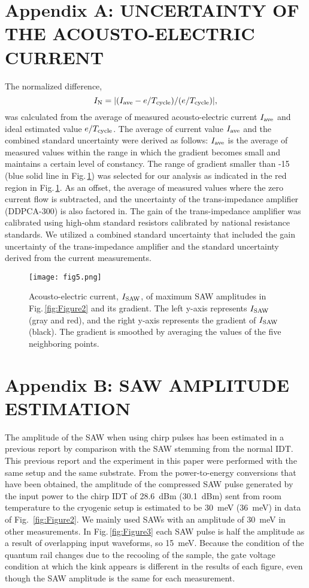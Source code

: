 \documentclass{article}
\begin{document}
\section*{Appendix A: UNCERTAINTY OF THE ACOUSTO-ELECTRIC CURRENT}
The normalized difference,
$$
I_{\rm N}=|(I_{\rm ave}-e/T_{\rm cycle})/(e/T_{\rm cycle})|,
$$
was calculated from the average of measured acousto-electric current $I_{\rm ave}$ and ideal estimated value $e/T_{\rm cycle}$. The average of current value $I_{\rm ave}$ and the combined standard uncertainty were derived as follows: $I_{\rm ave}$ is the average of measured values within the range in which the gradient becomes small and maintains a certain level of constancy. The range of gradient smaller than -15 (blue solid line in Fig.\,\ref{fig:Figure5}) was selected for our analysis as indicated in the red region in Fig.\,\ref{fig:Figure5}. As an offset, the average of measured values where the zero current flow is subtracted, and the uncertainty of the trans-impedance amplifier (DDPCA-300) is also factored in. The gain of the trans-impedance amplifier was calibrated using high-ohm standard resistors calibrated by national resistance standards. We utilized a combined standard uncertainty that included the gain uncertainty of the trans-impedance amplifier and the standard uncertainty derived from the current measurements.

\begin{figure}
\centering
\texttt{[image: fig5.png]}
\caption{\label{fig:Figure5} Acousto-electric current, $I_{\rm SAW}$, of maximum SAW amplitudes in Fig.\,\ref{fig:Figure2} and its gradient. The left y-axis represents $I_{\rm SAW}$ (gray and red), and the right y-axis represents the gradient of $I_{\rm SAW}$ (black). The gradient is smoothed by averaging the values of the five neighboring points.}
\end{figure}
 
\section*{Appendix B: SAW AMPLITUDE ESTIMATION}
The amplitude of the SAW when using chirp pulses has been estimated in a previous report \cite{JW_PRX2022} by comparison with the SAW stemming from the normal IDT. This previous report and the experiment in this paper were performed with the same setup and the same substrate. From the power-to-energy conversions that have been obtained, the amplitude of the compressed SAW pulse generated by the input power to the chirp IDT of \SI{28.6}{dBm} (\SI{30.1}{dBm}) sent from room temperature to the cryogenic setup is estimated to be \SI{30}{meV} (\SI{36}{meV}) in data of Fig.\, \ref{fig:Figure2}. We mainly used SAWs with an amplitude of \SI{30}{meV} in other measurements. In Fig.\,\ref{fig:Figure3} each SAW pulse is half the amplitude as a result of overlapping input waveforms, so \SI{15}{meV}. Because the condition of the quantum rail changes due to the recooling of the sample, the gate voltage condition at which the kink appears is different in the results of each figure, even though the SAW amplitude is the same for each measurement.
\end{document}
